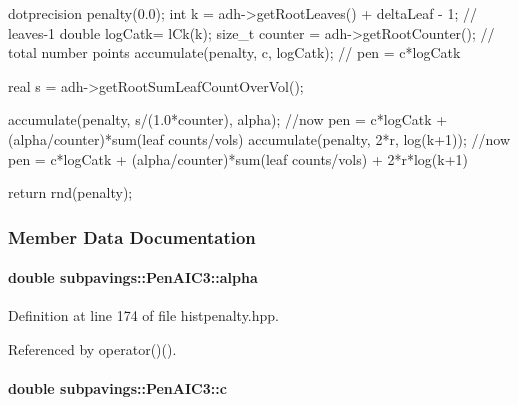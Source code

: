 \begin{DoxyCode}
      {
          dotprecision penalty(0.0);
          int k = adh->getRootLeaves() + deltaLeaf - 1; // leaves-1
          double logCatk= lCk(k);
          size_t counter = adh->getRootCounter(); // total number points
          accumulate(penalty, c, logCatk); // pen = c*logCatk
  
          real s = adh->getRootSumLeafCountOverVol();
  
          accumulate(penalty, s/(1.0*counter), alpha);
          //now pen = c*logCatk + (alpha/counter)*sum(leaf counts/vols)
          accumulate(penalty, 2*r, log(k+1));
          //now pen = c*logCatk + (alpha/counter)*sum(leaf counts/vols) +
       2*r*log(k+1)
  
          return rnd(penalty);
      }
\end{DoxyCode}


\subsubsection{\-Member \-Data \-Documentation}
\hypertarget{classsubpavings_1_1PenAIC3_a9a8e54711e178d6fb7c632311739fba7}{
\paragraph[{alpha}]{\setlength{\rightskip}{0pt plus 5cm}double {\bf subpavings\-::\-Pen\-A\-I\-C3\-::alpha}}}\label{classsubpavings_1_1PenAIC3_a9a8e54711e178d6fb7c632311739fba7}


\-Definition at line 174 of file histpenalty.\-hpp.



\-Referenced by operator()().

\hypertarget{classsubpavings_1_1PenAIC3_af838fbd8465a2144500c43058c28480d}{
\paragraph[{c}]{\setlength{\rightskip}{0pt plus 5cm}double {\bf subpavings\-::\-Pen\-A\-I\-C3\-::c}}}\label{classsubpavings_1_1PenAIC3_af838fbd8465a2144500c43058c28480d}


